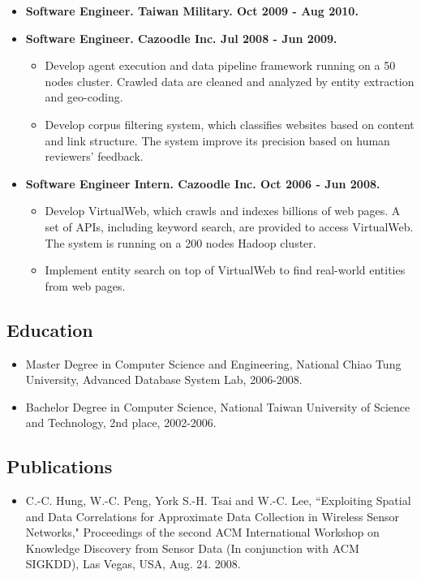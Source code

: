 \documentclass[10pt]{article}
\begin{document}
\begin{itemize}
\item \textbf{Software Engineer. Taiwan Military. Oct 2009 - Aug 2010.}

\item \textbf{Software Engineer. Cazoodle Inc. Jul 2008 - Jun 2009.}
\begin{itemize}
\item Develop agent execution and data pipeline framework running on a 50 nodes cluster. Crawled data are cleaned and analyzed by entity extraction and geo-coding.
\item Develop corpus filtering system, which classifies websites based on content and link structure. The system improve its precision based on human reviewers' feedback.
\end{itemize}

\item \textbf{Software Engineer Intern. Cazoodle Inc. Oct 2006 - Jun 2008.}
\begin{itemize}
\item Develop VirtualWeb, which crawls and indexes billions of web pages. A set of APIs, including keyword search, are provided to access VirtualWeb. The system is running on a 200 nodes Hadoop cluster.
\item Implement entity search on top of VirtualWeb to find real-world entities from web pages.
\end{itemize}

\end{itemize}

\subsection*{Education}
\begin{itemize}
\item Master Degree in Computer Science and Engineering, National Chiao Tung University, Advanced Database System Lab, 2006-2008.
\item Bachelor Degree in Computer Science, National Taiwan University of Science and Technology, 2nd place, 2002-2006.
\end{itemize}

\subsection*{Publications}
\begin{itemize}
\item C.-C. Hung, W.-C. Peng, York S.-H. Tsai and W.-C. Lee, ``Exploiting Spatial and Data Correlations for Approximate Data Collection in Wireless Sensor Networks," Proceedings of the second ACM International Workshop on Knowledge Discovery from Sensor Data (In conjunction with ACM SIGKDD), Las Vegas, USA, Aug. 24. 2008. 
\end{itemize}
\end{document}
